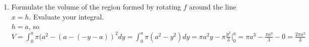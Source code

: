\documentclass{ximera}
\begin{document}
\begin{exercise}
\begin{enumerate}
        {\color{blue} For $f$: $y=-x+3$ so $x=-y+3$\\
        $V=\displaystyle \int_0^a\pi(-y+a)^2dy$\\
        $=-\pi\frac{(-y+a)^3}{3}\bigg|_0^a=-\frac{\pi}{3}(-a+a)^3+\frac{\pi}{3}(0+a)^3=\frac{\pi a^3}{3}$\\
        This is the same area as (a).\\
        For $g$: $y=\frac{1}{a}(x-a)^2$ so $x=a-\sqrt{ay}$\\
        $V=\displaystyle\int_0^a \pi(a-\sqrt{ay})^2dy$\\
        $=\displaystyle \pi\int_0^a (a^2-2a\sqrt{ay}+ay)dy$\\
        $=\displaystyle (a^2y-\frac{4}{3}(ay)^{\frac{3}{2}}+\frac{ay^2}{2})\bigg|_0^a=a^3-\frac{4}{3}a^3+\frac{a^3}{2}-0=\frac{\pi a^3}{6}$\\
        Different area from (b).}
        \item Formulate the volume of the region formed by rotating $f$ around the line $x=h$.  Evaluate your integral.  \\
        {\color{blue} $h=a$, so $V=\displaystyle\int_0^a \pi(a^2-(a-(-y-a))^2dy=\int_0^a \pi(a^2-y^2)dy=\pi a^2y-\pi\frac{y^3}{3}\bigg|_0^a=\pi a^3-\frac{\pi a^3}{3}-0=\frac{2\pi a^3}{3}$}

    \end{enumerate}
\end{exercise}
\end{document}
